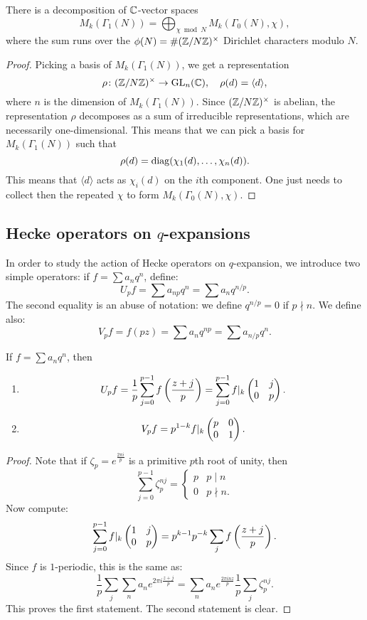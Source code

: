 \begin{theorem}
  There is a decomposition of $\mathbb{C}$-vector spaces
\[
M_k(\Gamma_1(N))=\bigoplus_{\chi\bmod N} M_k(\Gamma_0(N),\chi),
\]
where the sum runs over the $\phi(N)=\#(\mathbb{Z}/N\mathbb{Z})^\times$ Dirichlet characters modulo $N$.
\end{theorem}
\begin{proof}
  Picking a basis of $M_k(\Gamma_1(N))$, we get a representation
\[
\rho\colon (\mathbb{Z}/N\mathbb{Z})^\times\to \operatorname{GL}_n(\mathbb{C}),\quad \rho(d)=\langle d\rangle,
\]
where $n$ is the dimension of $M_k(\Gamma_1(N))$. Since $(\mathbb{Z}/N\mathbb{Z})^\times$ is abelian, the representation $\rho$ decomposes as a sum of irreducible representations, which are necessarily one-dimensional. This means that we can pick a basis for $M_k(\Gamma_1(N))$ such that
\[
\rho(d) = \operatorname{diag}(\chi_1(d),\ldots,\chi_n(d)).
\]
This means that $\langle d\rangle$ acts as $\chi_i(d)$ on the $i$th component. One just needs to collect then the repeated $\chi$ to form $M_k(\Gamma_0(N),\chi)$.
\end{proof}

\subsection{Hecke operators on \texorpdfstring{$q$}{q}-expansions}
In order to study the action of Hecke operators on $q$-expansion, we introduce two simple operators: if $f=\sum a_n q^n$, define:
\[
U_p f = \sum a_{np} q^n=\sum a_n q^{n/p}.
\]
The second equality is an abuse of notation: we define $q^{n/p}=0$ if $p\nmid n$. We define also:
\[
V_p f = f(pz) = \sum a_n q^{np} = \sum a_{n/p} q^n.
\]
\begin{lemma}
  If $f=\sum a_n q^n$, then
  \begin{enumerate}
  \item \[
U_p f = \frac 1p \sum_{j=0}^{p-1} f\left(\frac{z+j}{p}\right) = \sum_{j=0}^{p-1} f|_k \left(\begin{matrix}1&j\\0&p\end{matrix}\right).
\]

\item \[V_p f= p^{1-k} f|_k\left(\begin{matrix}p&0\\0&1\end{matrix}\right). \]
  \end{enumerate}
\end{lemma}
\begin{proof}
  Note that if $\zeta_p=e^{\frac{2\pi i}{p}}$ is a primitive $p$th root of unity, then
\[
\sum_{j=0}^{p-1} \zeta_p^{nj} = \begin{cases}
p&p\mid n\\
0&p\nmid n.
\end{cases}
\]
Now compute:
\[
\sum_{j=0}^{p-1} f|_k \left(\begin{matrix}1&j\\0&p\end{matrix}\right) = p^{k-1} p^{-k}\sum_j f\left(\frac{z+j}{p}\right).
\]
Since $f$ is $1$-periodic, this is the same as:
\[
\frac 1p \sum_j \sum_n a_n e^{2\pi i \frac{z+j}{p}} = \sum_n a_n e^{\frac{2\pi i n z}{p}} \frac 1p \sum_j \zeta_p^{nj}.
\]
This proves the first statement. The second statement is clear.
\end{proof}

